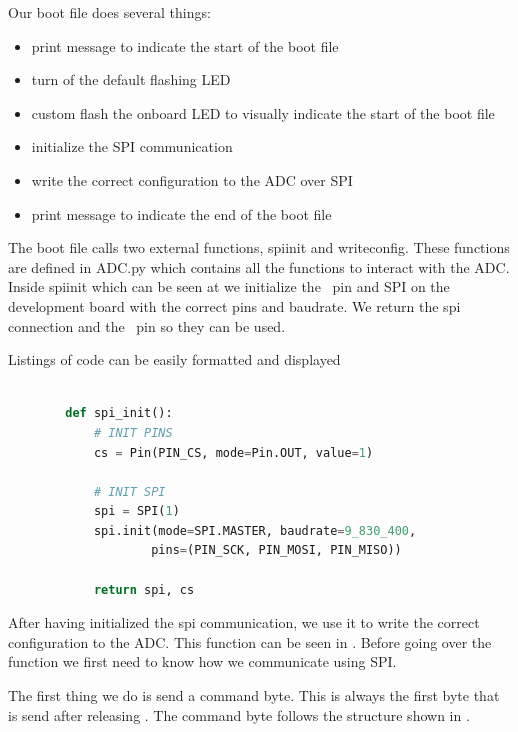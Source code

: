     Our boot file does several things: 
    \begin{itemize}
        \item print message to indicate the start of the boot file
        \item turn of the default flashing LED
        \item custom flash the onboard LED to visually indicate the start of the boot file
        \item initialize the SPI communication
        \item write the correct configuration to the ADC over SPI
        \item print message to indicate the end of the boot file
    \end{itemize}

    The boot file calls two external functions, spi\textunderscore init and write\textunderscore config. These functions are defined in ADC.py which contains all the functions to interact with the ADC.
    Inside spi\textunderscore init which can be seen at  we initialize the \pcs\ pin and SPI on the development board with the correct pins and baudrate. We return the spi connection and the \pcs~pin so they can be used.



    \begin{frame}[fragile]{Listings of code can be easily formatted and displayed}
        \begin{lstlisting}[language=Python, caption={Python function to initialize everything required for SPI communication},label={list: spi init}]
        
        def spi_init():
            # INIT PINS
            cs = Pin(PIN_CS, mode=Pin.OUT, value=1)

            # INIT SPI
            spi = SPI(1)
            spi.init(mode=SPI.MASTER, baudrate=9_830_400,
                    pins=(PIN_SCK, PIN_MOSI, PIN_MISO))

            return spi, cs
        \end{lstlisting}
    \end{frame}


    After having initialized the spi communication, we use it to write the correct configuration to the ADC. This function can be seen in . Before going over the function we first need to know how we communicate using SPI.




    The first thing we do is send a command byte. This is always the first byte that is send after releasing \pcs. 
    The command byte follows the structure shown in . 


